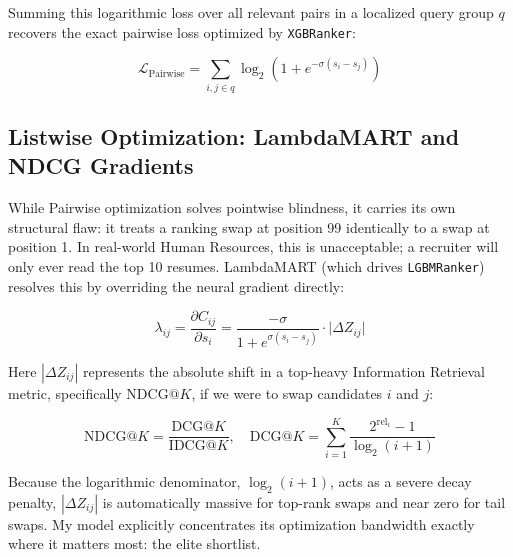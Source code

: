 \vspace{0.5em}

Summing this logarithmic loss over all relevant pairs in a localized query group $q$ recovers the exact pairwise loss optimized by \texttt{XGBRanker}:

\begin{equation}
\mathcal{L}_{\text{Pairwise}} = \sum_{i,j \in q} \log_2\!\left(1 + e^{-\sigma(s_i - s_j)}\right)
\label{eq:pairwise_loss}
\end{equation}

\subsection{Listwise Optimization: LambdaMART and NDCG Gradients}
\label{subsec:lambdamart}

While Pairwise optimization solves pointwise blindness, it carries its own structural flaw: it treats a ranking swap at position 99 identically to a swap at position 1. In real-world Human Resources, this is unacceptable; a recruiter will only ever read the top 10 resumes. LambdaMART (which drives \texttt{LGBMRanker}) resolves this by overriding the neural gradient directly:

\begin{equation}
\lambda_{ij} = \frac{\partial C_{ij}}{\partial s_i} = \frac{-\sigma}{1+e^{\sigma(s_i-s_j)}} \cdot \big|\Delta Z_{ij}\big|
\label{eq:lambda_gradient}
\end{equation}

\vspace{0.5em}

Here $|\Delta Z_{ij}|$ represents the absolute shift in a top-heavy Information Retrieval metric, specifically $\text{NDCG}@K$, if we were to swap candidates $i$ and $j$:

\begin{equation}
\text{NDCG}@K = \frac{\text{DCG}@K}{\text{IDCG}@K}, \quad \text{DCG}@K = \sum_{i=1}^{K}\frac{2^{\text{rel}_i}-1}{\log_2(i+1)}
\label{eq:ndcg}
\end{equation}

\vspace{0.5em}

Because the logarithmic denominator, $\log_2(i+1)$, acts as a severe decay penalty, $|\Delta Z_{ij}|$ is automatically massive for top-rank swaps and near zero for tail swaps. My model explicitly concentrates its optimization bandwidth exactly where it matters most: the elite shortlist.

